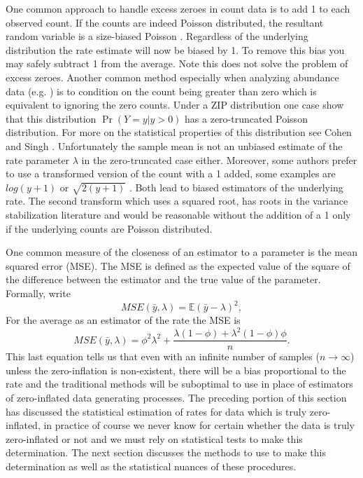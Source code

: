 \documentclass{article}
\begin{document}
One common approach to handle excess zeroes in count data is to add 1 to each observed count. If the counts are indeed Poisson distributed, the resultant random variable is a size-biased Poisson \cite{arratia2013size,arratia2010size}. Regardless of the underlying distribution the rate estimate will now be biased by 1. To remove this bias you may safely subtract 1 from the average. Note this does not solve the problem of excess zeroes. Another common method especially when analyzing abundance data (e.g. \cite{jagdale2013incidence}) is to condition on the count being greater than zero  which is equivalent to ignoring the zero counts. Under a ZIP distribution one case show that this distribution $\Pr(Y=y \vert y>0)$ has a zero-truncated Poisson distribution. For more on the statistical properties of this distribution see Cohen \cite{cohen1960estimating} and Singh \cite{singh1978characterization}. Unfortunately the sample mean is not an unbiased estimate of the rate parameter $\lambda$ in the zero-truncated case either. Moreover, some authors prefer to use a transformed version of the count with a 1 added, some examples are $log(y+1)$ \cite{howland2014spatial,centinari2016root} or $\sqrt{2(y+1)}$ \cite{anscombe1948transformation,yu2009variance}. Both lead to biased estimators of the underlying rate. The second transform which uses a squared root, has roots in the variance stabilization literature \cite{freeman1950transformations} and would be reasonable without the addition of a 1 only if the underlying counts are Poisson distributed.  

One common measure of the closeness of an estimator to a parameter is the mean squared error (MSE). The MSE is defined as the expected value of the square of the difference between the estimator and the true value of the parameter. Formally, write 
\begin{equation}
MSE(\bar{y}, \lambda) = \mathbb{E}(\bar{y}-\lambda)^2,
\end{equation}
For the average as an estimator of the rate the MSE is 
\begin{equation}
MSE(\bar{y}, \lambda) = \phi^2\lambda^2 + \frac{ \lambda(1-\phi) +\lambda^2(1-\phi)\phi}{n}.
\end{equation}
This last equation tells us that even with an infinite number of samples ($n \to \infty$) unless the zero-inflation is non-existent, there will be a bias proportional to the rate and the traditional methods will be suboptimal to use in place of estimators of zero-inflated data generating processes. The preceding portion of this section has discussed the statistical estimation of rates for data which is truly zero-inflated, in practice of course we never know for certain whether the data is truly zero-inflated or not and we must rely on statistical tests to make this determination. The next section discusses the methods to use to make this determination as well as the statistical nuances of these procedures.
 
\end{document}
